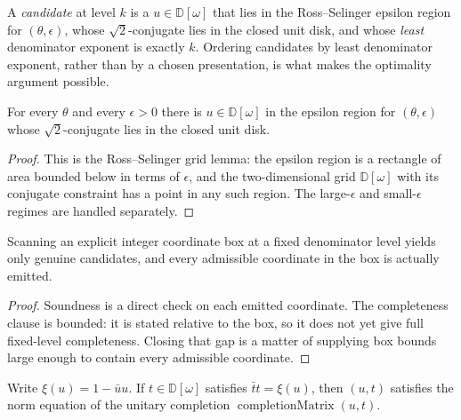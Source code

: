 \begin{definition}
  \label{def:candidate}
  \leanok
  A \emph{candidate} at level $k$ is a $u \in \mathbb{D}[\omega]$ that lies in
  the Ross--Selinger epsilon region for $(\theta,\epsilon)$, whose
  $\sqrt2$-conjugate lies in the closed unit disk, and whose \emph{least}
  denominator exponent is exactly $k$.  Ordering candidates by least
  denominator exponent, rather than by a chosen presentation, is what makes the
  optimality argument possible.
\end{definition}

\begin{lemma}
  \label{lem:grid_exists}
  \leanok
  For every $\theta$ and every $\epsilon > 0$ there is $u \in \mathbb{D}[\omega]$
  in the epsilon region for $(\theta,\epsilon)$ whose $\sqrt2$-conjugate lies in
  the closed unit disk.
\end{lemma}

\begin{proof}
  \leanok
  This is the Ross--Selinger grid lemma: the epsilon region is a rectangle of
  area bounded below in terms of $\epsilon$, and the two-dimensional grid
  $\mathbb{D}[\omega]$ with its conjugate constraint has a point in any such
  region.  The large-$\epsilon$ and small-$\epsilon$ regimes are handled
  separately.
\end{proof}

\begin{lemma}
  \label{lem:grid_bounded}
  \leanok
  Scanning an explicit integer coordinate box at a fixed denominator level
  yields only genuine candidates, and every admissible coordinate in the box is
  actually emitted.
\end{lemma}

\begin{proof}
  \leanok
  Soundness is a direct check on each emitted coordinate.  The completeness
  clause is bounded: it is stated relative to the box, so it does not yet give
  full fixed-level completeness.  Closing that gap is a matter of supplying box
  bounds large enough to contain every admissible coordinate.
\end{proof}

\begin{lemma}
  \label{lem:norm_eq}
  \leanok
  Write $\xi(u) = 1 - \bar u u$.  If $t \in \mathbb{D}[\omega]$ satisfies
  $\bar t t = \xi(u)$, then $(u,t)$ satisfies the norm equation of the unitary
  completion $\operatorname{completionMatrix}(u,t)$.
\end{lemma}

